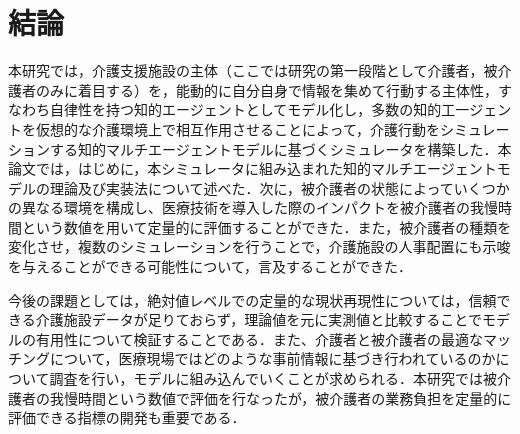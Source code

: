 \chapter{結論}

本研究では，介護支援施設の主体（ここでは研究の第一段階として介護者，被介護者のみに着目する）を，能動的に自分自身で情報を集めて行動する主体性，すなわち自律性を持つ知的エージェントとしてモデル化し，多数の知的工一ジェントを仮想的な介護環境上で相互作用させることによって，介護行動をシミュレーションする知的マルチエージェントモデルに基づくシミュレータを構築した．本論文では，はじめに，本シミュレータに組み込まれた知的マルチエージェントモデルの理論及び実装法について述べた．次に，被介護者の状態によっていくつかの異なる環境を構成し、医療技術を導入した際のインパクトを被介護者の我慢時間という数値を用いて定量的に評価することができた．また，被介護者の種類を変化させ，複数のシミュレーションを行うことで，介護施設の人事配置にも示唆を与えることができる可能性について，言及することができた．

今後の課題としては，絶対値レベルでの定量的な現状再現性については，信頼できる介護施設データが足りておらず，理論値を元に実測値と比較することでモデルの有用性について検証することである．また、介護者と被介護者の最適なマッチングについて，医療現場ではどのような事前情報に基づき行われているのかについて調査を行い，モデルに組み込んでいくことが求められる．本研究では被介護者の我慢時間という数値で評価を行なったが，被介護者の業務負担を定量的に評価できる指標の開発も重要である．
